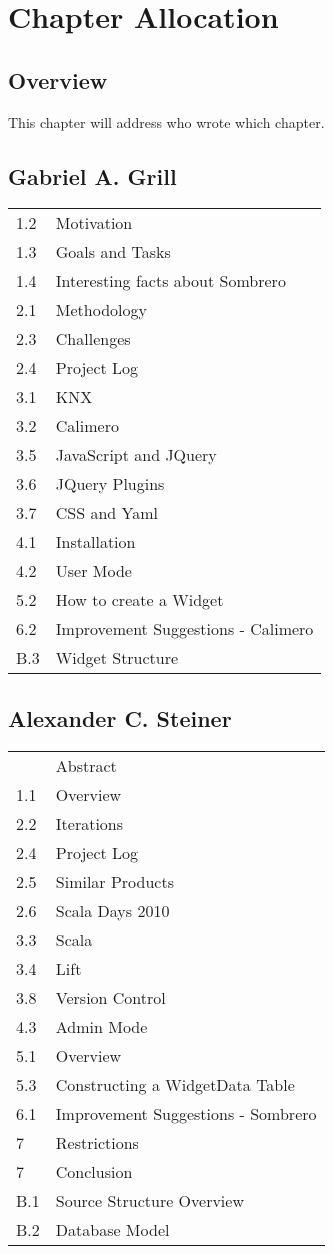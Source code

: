 \chapter*{Chapter Allocation}
\section*{Overview}
This chapter will address who wrote which chapter.

\section*{Gabriel A. Grill}
\begin{tabular}{l l}
1.2 & Motivation \\
1.3 & Goals and Tasks \\
1.4 & Interesting facts about Sombrero \\
2.1 & Methodology \\
2.3 & Challenges \\
2.4 & Project Log \\
3.1 & KNX \\
3.2 & Calimero \\
3.5 & JavaScript and JQuery \\
3.6 & JQuery Plugins \\
3.7 & CSS and Yaml \\
4.1 & Installation \\
4.2 & User Mode \\
5.2 & How to create a Widget \\
6.2 & Improvement Suggestions - Calimero \\
B.3 & Widget Structure \\
\end{tabular}

\section*{Alexander C. Steiner}
\begin{tabular}{l l }
    & Abstract \\
1.1 & Overview \\
2.2 & Iterations \\
2.4 & Project Log \\
2.5 & Similar Products \\
2.6 & Scala Days 2010 \\
3.3 & Scala \\
3.4 & Lift \\
3.8 & Version Control \\
4.3 & Admin Mode \\
5.1 & Overview \\
5.3 & Constructing a WidgetData Table \\
6.1 & Improvement Suggestions - Sombrero \\
7   & Restrictions \\
7   & Conclusion \\
B.1 & Source Structure Overview \\
B.2 & Database Model \\
\end{tabular}



